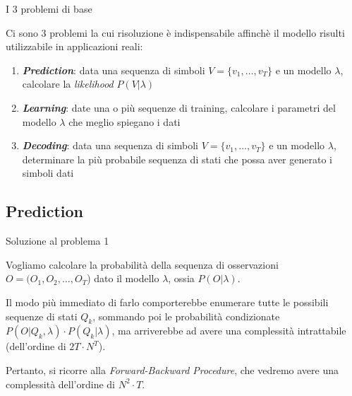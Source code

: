 \documentclass[slidestop,mathserif,red]{beamer}
\begin{document}
\begin{frame}{I 3 problemi di base}
 \begin{block}{}
  Ci sono 3 problemi la cui risoluzione \`e indispensabile affinch\`e il modello risulti utilizzabile in applicazioni reali:
	\begin{enumerate}
	 \item \textit{\textbf{Prediction}}: data una sequenza di simboli $V = \{v_{1}, \ldots, v_{T}\}$ e un modello $\lambda$, calcolare la \textit{likelihood} $P(V|\lambda)$
	 \item \textbf{\textit{Learning}}: date una o pi\`u sequenze di training, calcolare i parametri del modello $\lambda$ che meglio spiegano i dati
	 \item \textit{\textbf{Decoding}}: data una sequenza di simboli $V = \{v_{1}, \ldots, v_{T}\}$ e un modello $\lambda$, determinare la pi\`u probabile sequenza di stati che possa aver generato i simboli dati
	\end{enumerate}
 \end{block}
\end{frame}

\subsection{Prediction}

\begin{frame}{Soluzione al problema 1}
 \begin{block}{}
  Vogliamo calcolare la probabilit\`a della sequenza di osservazioni $O = (O_{1}, O_{2}, \ldots, O_{T}$) dato il modello $\lambda$, ossia $P(O|\lambda)$.
 \end{block}
\begin{block}{}
Il modo pi\`u immediato di farlo comporterebbe enumerare tutte le possibili sequenze di stati $Q_{k}$, sommando poi le probabilit\`a condizionate $P(O|Q_{k},\lambda) \cdot P(Q_{k}|\lambda)$, ma arriverebbe ad avere una complessit\`a intrattabile (dell'ordine di $2T \cdot N^{T}$).
 \end{block}
\begin{block}{}
Pertanto, si ricorre alla \textit{Forward-Backward Procedure}, che vedremo avere una complessit\`a dell'ordine di $N^2 \cdot T$.
 \end{block}

\end{frame}
\end{document}
